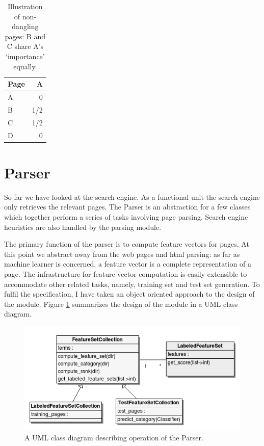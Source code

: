 \documentclass[12pt,twoside,notitlepage]{report}
\begin{document}
\begin{table}
    \begin{center}
      \begin{tabular}{|l|r|}
        \hline
        Page & A \\ \hline
         A &  0  \\ \hline
         B & 1/2 \\ \hline
         C & 1/2 \\ \hline
         D & 0   \\ \hline
      \end{tabular}
      \caption{Illustration of non-dangling pages: B and C share A's `importance' equally.\label{tab}}
  \end{center}
\end{table}

\section{Parser}

So far we have looked at the search engine. As a functional unit the search
engine only retrieves the relevant pages. The Parser is an abstraction for a
few classes which together perform a series of tasks involving page parsing. 
Search engine heuristics are also handled by the parsing module.

The primary function of the parser is to compute feature vectors for pages.
At this point we abstract away from the web pages and html parsing:
as far as machine learner is concerned, a feature vector is a complete
representation of a page.
The infrastructure for feature vector computation is easily extensible to
accommodate other related tasks, namely, training set and test set generation.
To fulfil the specification, I have taken an object oriented approach to the
design of the module. Figure \ref{uml} summarizes the design of the module in a
UML class diagram.

\begin{figure}
\centering
\includegraphics[scale=0.5]{figs/uml.png}
\caption{A UML class diagram describing operation of the Parser.}
\label{uml}
\end{figure}
\end{document}
